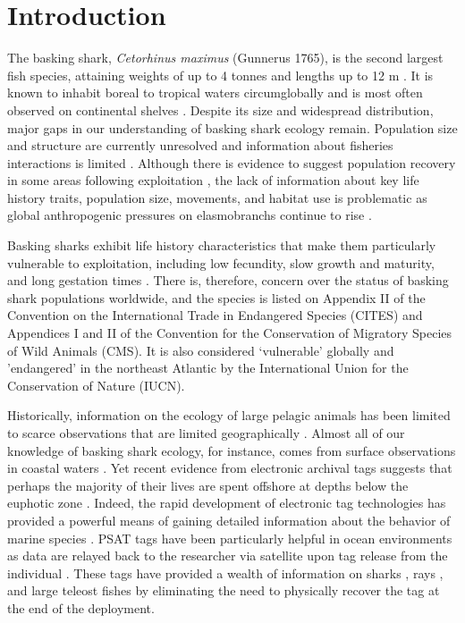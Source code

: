 \section{Introduction}
The basking shark, \textit{Cetorhinus maximus} (Gunnerus 1765), is the second largest fish species, attaining weights of up to 4 tonnes and lengths up to 12 m \citep{Sims2008}. It is known to inhabit boreal to tropical \citep{Skomal2009} waters circumglobally and is most often observed on continental shelves \citep{Sims2006}. Despite its size and widespread distribution, major gaps in our understanding of basking shark ecology remain. Population size and structure are currently unresolved and information about fisheries interactions is limited \citep{Sims2008}. Although there is evidence to suggest population recovery in some areas following exploitation \citep{Witt2012}, the lack of information about key life history traits, population size, movements, and habitat use is problematic as global anthropogenic pressures on elasmobranchs continue to rise \citep{Dulvy2008, Ferretti2010}.

Basking sharks exhibit life history characteristics that make them particularly vulnerable to exploitation, including low fecundity, slow growth and maturity, and long gestation times \citep{Compagno1984, Sims2008}. There is, therefore, concern over the status of basking shark populations worldwide, and the species is listed on Appendix II of the Convention on the International Trade in Endangered Species (CITES) and Appendices I and II of the Convention for the Conservation of Migratory Species of Wild Animals (CMS). It is also considered ‘vulnerable’ globally and 'endangered' in the northeast Atlantic by the International Union for the Conservation of Nature (IUCN).

Historically, information on the ecology of large pelagic animals has been limited to scarce observations that are limited geographically \citep{Templeman1963, Squire1990, Francis2002}. Almost all of our knowledge of basking shark ecology, for instance, comes from surface observations in coastal waters \citep{Sims2006, Sims2008}.  Yet recent evidence from electronic archival tags suggests that perhaps the majority of their lives are spent offshore at depths below the euphotic zone \citep{Skomal2009}. Indeed, the rapid development of electronic tag technologies has provided a powerful means of gaining detailed information about the behavior of marine species \citep{Block2011}. PSAT tags have been particularly helpful in ocean environments as data are relayed back to the researcher via satellite upon tag release from the individual \citep[\emph{e.g.}][]{Block2011}. These tags have provided a wealth of information on sharks \citep{Werry2014, Berumen2014}, rays \citep{Braun2014, Thorrold2014a}, and large teleost fishes \citep{Braun2015a} by eliminating the need to physically recover the tag at the end of the deployment. 

